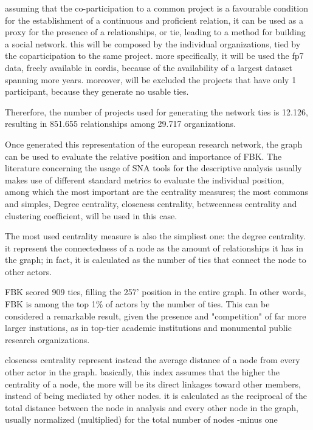 assuming that the co-participation to a common project is a favourable condition for the establishment of a continuous and proficient relation, it can be used as a proxy for the presence of a relationships, or tie, leading to a method for building a social network. this will be composed by the individual organizations, tied by the coparticipation to the same project. more specifically, it will be used the fp7 data, freely available in cordis, because of the availability of a largest dataset spanning more years. moreover, will be excluded the projects that have only 1 participant, because they generate no usable ties.

Thererfore, the number of projects used for generating the network ties is 12.126, resulting in 851.655 relationships among 29.717 organizations. 

Once generated this representation of the european research network, the graph can be used to evaluate the relative position and importance of FBK. The literature concerning the usage of SNA tools for the descriptive analysis usually makes use of different standard metrics to evaluate the individual position, among which the most important are the centrality measures; the most commons and simples, Degree centrality, closeness centrality, betweenness centrality and clustering coefficient, will be used in this case.

The most used centrality measure is also the simpliest one: the degree centrality. it represent the connectedness of a node as the amount of relationships it has in the graph; in fact, it is calculated as the number of ties that connect the node to other actors.  

FBK scored 909 ties, filling the 257' position in the entire graph. In other words, FBK is among the top 1\% of actors by the number of ties. This can be considered a remarkable result, given the presence and "competition" of far more larger instutions, as in top-tier academic institutions and monumental public research organizations. 

closeness centrality represent instead the average distance of a node from every other actor in the graph. basically, this index assumes that the higher the centrality of a node, the more will be its direct linkages toward other members, instead of being mediated by other nodes. it is calculated as the reciprocal of the total distance between the node in analysis and every other node in the graph, usually normalized (multiplied) for the total number of nodes -minus one 


